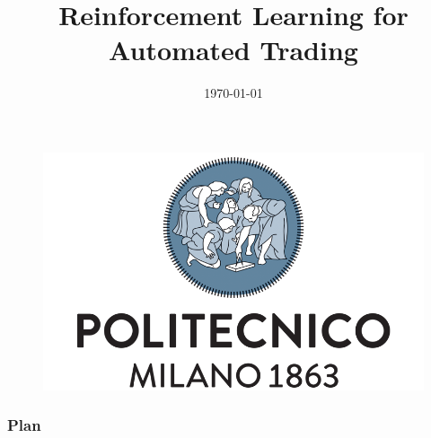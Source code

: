 \documentclass{beamer}
\title[]{Reinforcement Learning for Automated Trading}
\author[P.\,Necchi]
{%
  \texorpdfstring{
    \begin{columns}%
      \column{1\linewidth}
      \centering
      Pierpaolo Necchi\\
      \href{mailto:pierpaolo.necchi@gmail.com}{pierpaolo.necchi@gmail.com}
    \end{columns}
  }
  {Pierpaolo Necchi}
}
\institute[Polimi] %
{%
}
\date{\today}
\begin{document}
\begin{frame}[plain]
	\begin{figure}[htpb]
		\centering
		\includegraphics[width=0.5\linewidth]{Images/polimi_name}
	\end{figure}
	\titlepage
\end{frame}


\begin{frame}
\frametitle{Plan} %
\tableofcontents %
\end{frame}









%
%
%
\end{document}
